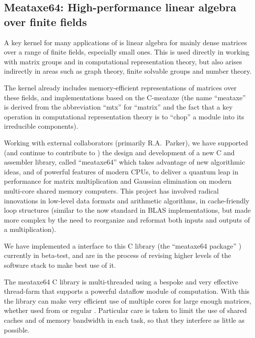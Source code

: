 \documentclass{deliverablereport}
\begin{document}



\subsection{Meataxe64: High-performance linear algebra over finite fields}\label{meataxe64}

A key kernel for many applications of \GAP is linear algebra for
mainly dense matrices over
a range of finite fields, especially small ones. This is used directly in working with
matrix groups and in computational representation theory, but also
arises indirectly in areas such as graph theory, finite solvable
groups and number theory. 

The \GAP kernel already includes memory-efficient
representations of matrices over these fields, and implementations
based on the C-meataxe (the name ``meataxe'' is derived from the
abbreviation ``mtx'' for ``matrix'' and the fact that a key operation
in computational representation theory is to ``chop'' a module into
its irreducible components).

Working with external collaborators (primarily R.A.~Parker),
we have supported (and continue to contribute to ) the design and development 
of a new C and assembler library, called ``meataxe64'' which takes
advantage of new algorithmic ideas, and of powerful features of modern
CPUs, to deliver a quantum leap in performance for matrix
multiplication and Gaussian elimination on modern multi-core shared
memory computers. This project has involved radical innovations in
low-level data formats and arithmetic algorithms, in cache-friendly
loop structures (similar to the now standard in BLAS implementations,
but made more complex by the need to reorganize and reformat both
inputs and outputs of a multiplication). 

We have implemented a
\GAP interface to this C library (the ``meataxe64 \GAP package'' \cite{meataxe64}) currently in
beta-test, and are in the process of revising higher levels of the software stack to make best
use of it.

The meataxe64 C library is multi-threaded using a bespoke and very
effective thread-farm that supports a powerful dataflow module of
computation. With this the library can make very efficient
use of multiple cores for large enough matrices, whether used from
\HPCGAP or regular \GAP. Particular care is taken to limit the use of
shared caches and of memory bandwidth in each task, so that they
interfere as little as possible. 
\end{document}
